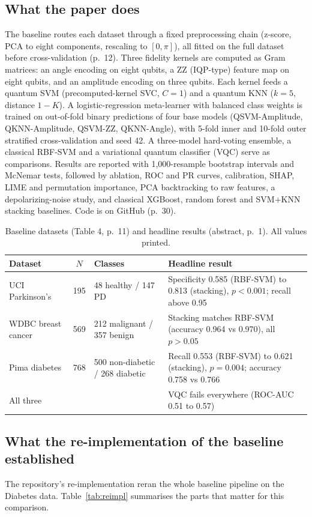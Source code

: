 \documentclass[11pt,a4paper]{article}
\begin{document}
\subsection{What the paper does}
The baseline routes each dataset through a fixed preprocessing chain (z-score, PCA to eight components, rescaling to $[0,\pi]$), all fitted on the full dataset before cross-validation (p.~12). Three fidelity kernels are computed as Gram matrices: an angle encoding on eight qubits, a ZZ (IQP-type) feature map on eight qubits, and an amplitude encoding on three qubits. Each kernel feeds a quantum SVM (precomputed-kernel SVC, $C=1$) and a quantum KNN ($k=5$, distance $1-K$). A logistic-regression meta-learner with balanced class weights is trained on out-of-fold binary predictions of four base models (QSVM-Amplitude, QKNN-Amplitude, QSVM-ZZ, QKNN-Angle), with 5-fold inner and 10-fold outer stratified cross-validation and seed 42. A three-model hard-voting ensemble, a classical RBF-SVM and a variational quantum classifier (VQC) serve as comparisons. Results are reported with 1,000-resample bootstrap intervals and McNemar tests, followed by ablation, ROC and PR curves, calibration, SHAP, LIME and permutation importance, PCA backtracking to raw features, a depolarizing-noise study, and classical XGBoost, random forest and SVM+KNN stacking baselines. Code is on GitHub (p.~30).

\begin{table}[H]
\centering\footnotesize
\caption{Baseline datasets (Table 4, p.~11) and headline results (abstract, p.~1). All values printed.}
\label{tab:base}
\begin{tabularx}{\textwidth}{l c l Y}
\toprule
Dataset & $N$ & Classes & Headline result \\
\midrule
UCI Parkinson's & 195 & 48 healthy / 147 PD & Specificity 0.585 (RBF-SVM) to 0.813 (stacking), $p<0.001$; recall above 0.95 \\
WDBC breast cancer & 569 & 212 malignant / 357 benign & Stacking matches RBF-SVM (accuracy 0.964 vs 0.970), all $p>0.05$ \\
Pima diabetes & 768 & 500 non-diabetic / 268 diabetic & Recall 0.553 (RBF-SVM) to 0.621 (stacking), $p=0.004$; accuracy 0.758 vs 0.766 \\
All three & & & VQC fails everywhere (ROC-AUC 0.51 to 0.57) \\
\bottomrule
\end{tabularx}
\end{table}

\subsection{What the re-implementation of the baseline established}
The repository's re-implementation reran the whole baseline pipeline on the Diabetes data. Table~\ref{tab:reimpl} summarises the parts that matter for this comparison.
\end{document}
